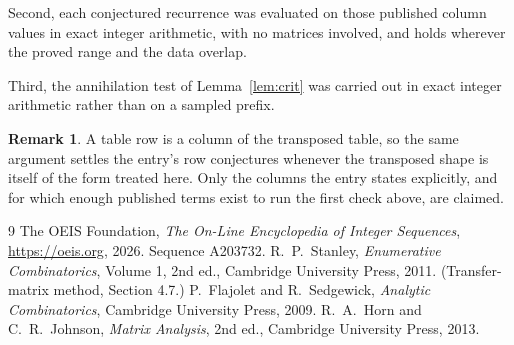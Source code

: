\documentclass[11pt,a4paper]{article}
\theoremstyle{plain}
\theoremstyle{definition}
\newtheorem{remark}[theorem]{Remark}
\begin{document}
Second, each conjectured recurrence was evaluated on those published column values in exact
integer arithmetic, with no matrices involved, and holds wherever the proved range and the
data overlap.

Third, the annihilation test of Lemma~\ref{lem:crit} was carried out in exact integer
arithmetic rather than on a sampled prefix.

\begin{remark}
A table row is a column of the transposed table, so the same argument settles the entry's row
conjectures whenever the transposed shape is itself of the form treated here. Only the columns
the entry states explicitly, and for which enough published terms exist to run the first check
above, are claimed.
\end{remark}

\begin{thebibliography}{9}
 The OEIS Foundation, \emph{The On-Line Encyclopedia of Integer
Sequences}, \url{https://oeis.org}, 2026. Sequence A203732.
 R.~P.~Stanley, \emph{Enumerative Combinatorics}, Volume 1, 2nd ed.,
Cambridge University Press, 2011. (Transfer-matrix method, Section 4.7.)
 P.~Flajolet and R.~Sedgewick, \emph{Analytic Combinatorics}, Cambridge
University Press, 2009.
 R.~A.~Horn and C.~R.~Johnson, \emph{Matrix Analysis}, 2nd ed., Cambridge
University Press, 2013.
\end{thebibliography}
\end{document}
